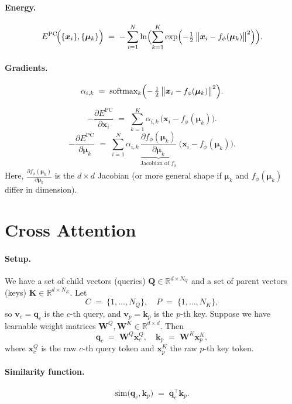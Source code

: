 \documentclass{article}
\begin{document}
\paragraph{Energy.}
\begin{equation}
E^{\mathrm{PC}}\!\Bigl(\{\bm{x}_i\}, \{\bm{\mu}_k\}\Bigr)
\;=\;
-\sum_{i=1}^N
\ln \Bigl(\sum_{k=1}^K
\exp\Bigl(-\tfrac12\,\bigl\|\bm{x}_i - f_\phi(\bm{\mu}_k)\bigr\|^2\Bigr)\Bigr).
\end{equation}

\paragraph{Gradients.}
\[
\alpha_{i,k}
\;=\;
\mathrm{softmax}_k\Bigl(
-\,\tfrac12\,\bigl\|\bm{x}_i - f_\phi(\bm{\mu}_k)\bigr\|^2
\Bigr).
\]

\[
-\frac{\partial E^{\mathrm{PC}}}{\partial \bm{x}_i}
\;=\;
\sum_{k=1}^K 
\alpha_{i,k}\,\bigl(\bm{x}_i - f_\phi(\bm{\mu}_k)\bigr).
\]
\[
-\frac{\partial E^{\mathrm{PC}}}{\partial \bm{\mu}_k}
\;=\;
\sum_{i=1}^N 
\alpha_{i,k}\,
\underbrace{
\frac{\partial f_\phi(\bm{\mu}_k)}{\partial \bm{\mu}_k}
}_{\text{Jacobian of }f_\phi}
\;\bigl(\bm{x}_i - f_\phi(\bm{\mu}_k)\bigr).
\]
Here, \(\tfrac{\partial f_\phi(\bm{\mu}_k)}{\partial \bm{\mu}_k}\) is the \(d\times d\) Jacobian (or more general shape if \(\bm{\mu}_k\) and \(f_\phi(\bm{\mu}_k)\) differ in dimension). 

 
\section{Cross Attention}

\paragraph{Setup.}
We have a set of child vectors (queries) \(\bm{Q}\in\mathbb{R}^{d\times N_Q}\) and a set of parent vectors (keys) \(\bm{K}\in\mathbb{R}^{d\times N_K}\).  Let
\[
C \;=\;\{1,\ldots,N_Q\}, 
\quad
P \;=\;\{1,\ldots,N_K\},
\]
so \(\bm{v}_c = \bm{q}_c\) is the \(c\)-th query, and \(\bm{v}_p = \bm{k}_p\) is the \(p\)-th key.  Suppose we have learnable weight matrices \(\bm{W}^Q,\bm{W}^K \in \mathbb{R}^{d \times d}\).  Then
\[
\bm{q}_c 
\;=\;
\bm{W}^Q\bm{x}^Q_c,
\quad
\bm{k}_p 
\;=\;
\bm{W}^K\bm{x}^K_p,
\]
where \(\bm{x}^Q_c\) is the raw \(c\)-th query token and \(\bm{x}^K_p\) the raw \(p\)-th key token.

\paragraph{Similarity function.}
\[
\mathrm{sim}\bigl(\bm{q}_c, \bm{k}_p\bigr)
\;=\;
\bm{q}_c^\top \bm{k}_p.
\]
\end{document}
